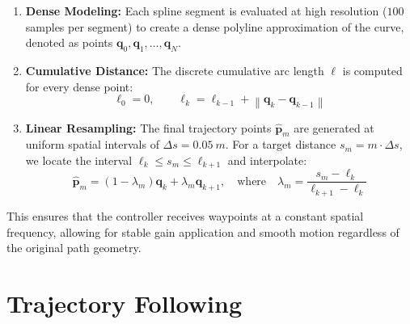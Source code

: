 \documentclass[11pt]{article}
\begin{document}
\begin{enumerate}
    \item \textbf{Dense Modeling:} Each spline segment is evaluated at high resolution ($100$ samples per segment) to
          create a dense polyline approximation of the curve, denoted as points $\mathbf{q}_0, \mathbf{q}_1, \ldots,
          \mathbf{q}_N$.
    \item \textbf{Cumulative Distance:} The discrete cumulative arc length $\ell$ is computed for every dense point:
    \[ \ell_0 = 0, \qquad \ell_k = \ell_{k-1} + \left\lVert \mathbf{q}_k - \mathbf{q}_{k-1} \right\rVert \]
    \item \textbf{Linear Resampling:} The final trajectory points $\hat{\mathbf{p}}_m$ are generated at uniform spatial
          intervals of $\Delta s = \SI{0.05}{m}$. For a target distance $s_m = m \cdot \Delta s$, we locate the interval
          $\ell_k \le s_m \le \ell_{k+1}$ and interpolate:
    \[ \hat{\mathbf{p}}_m = (1-\lambda_m)\mathbf{q}_k + \lambda_m \mathbf{q}_{k+1}, \quad \text{where} \quad \lambda_m =
    \frac{s_m - \ell_k}{\ell_{k+1}-\ell_k} \]
\end{enumerate}
\noindent This ensures that the controller receives waypoints at a constant spatial frequency, allowing for stable gain
          application and smooth motion regardless of the original path geometry.

\section{Trajectory Following}
\end{document}
